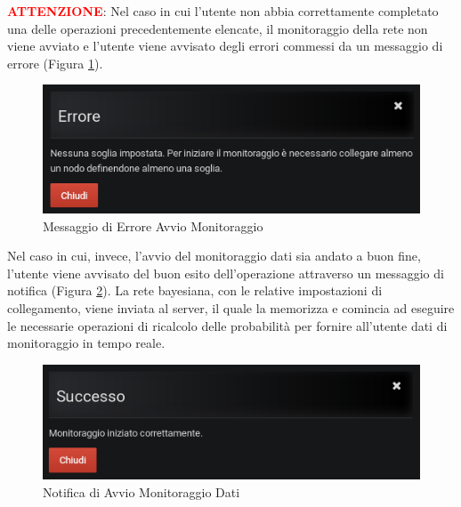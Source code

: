 \pagebreak

\textbf{\textcolor{red}{ATTENZIONE}}: Nel caso in cui l'utente non abbia correttamente completato una delle operazioni precedentemente elencate, il monitoraggio della rete non viene avviato e l'utente viene avvisato degli errori commessi da un messaggio di errore (Figura \ref{ErroreAvvio}).

\begin{figure}[H]
	\begin{center}
		\includegraphics[scale=0.6]{./images/ErroreAvvio.png}
		 \caption{Messaggio di Errore Avvio Monitoraggio}	
		 \label{ErroreAvvio}
	\end{center}
\end{figure}

Nel caso in cui, invece, l'avvio del monitoraggio dati sia andato a buon fine, l'utente viene avvisato del buon esito dell'operazione attraverso un messaggio di notifica (Figura \ref{NotificaMonitoraggio}). La rete bayesiana, con le relative impostazioni di collegamento, viene inviata al server, il quale la memorizza e comincia ad eseguire le necessarie operazioni di ricalcolo delle probabilità per fornire all'utente dati di monitoraggio in tempo reale.

\begin{figure}[H]
	\begin{center}
		\includegraphics[scale=0.6]{./images/NotificaMonitoraggio.png}
		 \caption{Notifica di Avvio Monitoraggio Dati}	
		 \label{NotificaMonitoraggio}
	\end{center}
\end{figure}


